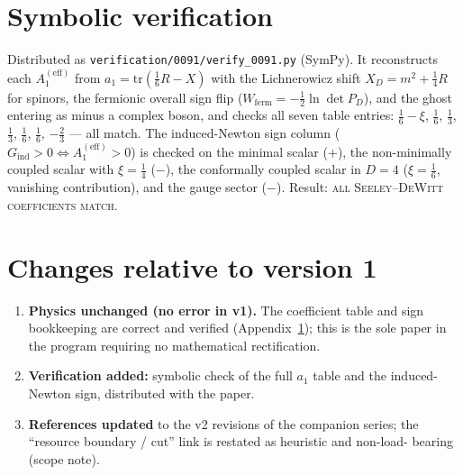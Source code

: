 \documentclass[11pt,a4paper]{article}
\newcommand{\Aeff}{A_1^{(\mathrm{eff})}}
\begin{document}
\appendix

\section{Symbolic verification}\label{app:verif}

Distributed as \texttt{verification/0091/verify\_0091.py} (SymPy). It
reconstructs each $\Aeff$ from $a_1 = \mathrm{tr}(\tfrac16 R - X)$ with the
Lichnerowicz shift $X_D = m^2 + \tfrac14 R$ for spinors, the fermionic
overall sign flip ($W_{\mathrm{ferm}} = -\tfrac12\ln\det P_D$), and the ghost
entering as minus a complex boson, and checks all seven table entries:
$\tfrac16-\xi$, $\tfrac16$, $\tfrac13$, $\tfrac13$, $\tfrac16$, $\tfrac16$,
$-\tfrac23$ --- all match. The induced-Newton sign column ($G_{\mathrm{ind}}
> 0 \iff \Aeff > 0$) is checked on the minimal scalar ($+$), the non-minimally coupled scalar with
$\xi=\tfrac14$ ($-$), the conformally coupled scalar in $D=4$ ($\xi=\tfrac16$,
vanishing contribution), and the gauge sector ($-$). Result: \textsc{all Seeley--DeWitt coefficients
match}.

\section{Changes relative to version 1}

\begin{enumerate}
\item \textbf{Physics unchanged (no error in v1).} The coefficient table and
sign bookkeeping are correct and verified (Appendix~\ref{app:verif}); this is
the sole paper in the program requiring no mathematical rectification.
\item \textbf{Verification added:} symbolic check of the full $a_1$ table and
the induced-Newton sign, distributed with the paper.
\item \textbf{References updated} to the v2 revisions of the companion series;
the ``resource boundary / cut'' link is restated as heuristic and non-load-
bearing (scope note).
\end{enumerate}
\end{document}
